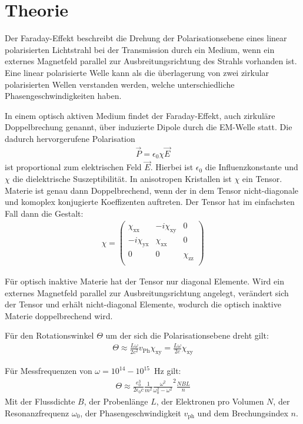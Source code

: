 \section{Theorie}
\label{sec:Theorie}

Der Faraday-Effekt beschreibt die Drehung der Polarisationsebene eines linear
polarisierten Lichtstrahl bei der Transmission durch ein Medium, wenn ein
externes Magnetfeld parallel zur Ausbreitungsrichtung des Strahls vorhanden
ist. Eine linear polarisierte Welle kann als die überlagerung von zwei
zirkular polarisierten Wellen verstanden werden, welche unterschiedliche
Phasengeschwindigkeiten haben.

In einem optisch aktiven Medium findet der Faraday-Effekt, auch zirkuläre Doppelbrechung genannt, über induzierte
Dipole durch die EM-Welle statt. Die dadurch hervorgerufene Polarisation
\begin{align}
  \vec{P} = \epsilon_0 \chi \vec{E}
\end{align}
ist proportional zum elektrischen Feld $\vec{E}$. Hierbei ist $\epsilon_0$ die
Influenzkonstante und $\chi $ die dielektrische Suszeptibilität. In anisotropen
Kristallen ist $\chi$ ein Tensor. Materie ist genau dann Doppelbrechend, wenn der in dem
Tensor nicht-diagonale und komoplex konjugierte Koeffizenten auftreten. Der Tensor
hat im einfachsten Fall dann die Gestalt:
\begin{align}
  \chi =
  \left( \begin{matrix}
         \chi_{\mathrm{xx}} & -i \chi_{\mathrm{xy}} & 0 \\
         -i \chi_{\mathrm{yx}} & \chi_{\mathrm{xx}} & 0 \\
         0 & 0 & \chi_{\mathrm{zz}}  \\
  \end{matrix} \right)
\end{align}

Für optisch inaktive Materie hat der Tensor nur diagonal Elemente. Wird ein
externes Magnetfeld parallel zur Ausbreitungsrichtung angelegt, verändert sich der Tensor und erhält
nicht-diagonal Elemente, wodurch die optisch inaktive Materie doppelbrechend wird.

Für den Rotationswinkel $\Theta$ um der sich die Polarisationsebene dreht gilt:
\begin{align}
  \Theta \approx \frac{L \omega}{2 c^2}v_{\mathrm{Ph}} \chi_{\mathrm{xy}} = \frac{L \omega}{2 c}\chi_{\mathrm{xy}}
\end{align}

Für Messfrequenzen von $\omega = 10^{14}-10^{15}$\, Hz gilt:
\begin{align}
  \Theta \approx \frac{e^3_0}{2 \epsilon_0 c} \frac{1}{m^2}\frac{\omega^2}{\omega^2_0 - \omega^2}^2 \frac{NBL}{n} \label{eqn:theta}
\end{align}
Mit der Flussdichte $B$, der Probenlänge $L$, der Elektronen pro Volumen $N$, der Resonanzfrequenz $\omega_0$,
der Phasengeschwindigkeit $v_{\mathrm{ph}}$ und dem Brechungsindex $n$.

